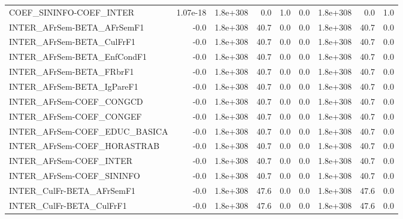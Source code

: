 \begin{tabular}{lrrrrrrrr}
COEF\_SININFO-COEF\_INTER              &    1.07e-18 &     1.8e+308 &     0.0 &      1.0 &        0.0 &    1.8e+308 &          0.0 &           1.0 \\
INTER\_AFrSem-BETA\_AFrSemF1           &        -0.0 &     1.8e+308 &    40.7 &      0.0 &        0.0 &    1.8e+308 &         40.7 &           0.0 \\
INTER\_AFrSem-BETA\_CulFrF1            &        -0.0 &     1.8e+308 &    40.7 &      0.0 &        0.0 &    1.8e+308 &         40.7 &           0.0 \\
INTER\_AFrSem-BETA\_EnfCondF1          &        -0.0 &     1.8e+308 &    40.7 &      0.0 &        0.0 &    1.8e+308 &         40.7 &           0.0 \\
INTER\_AFrSem-BETA\_FRbrF1             &        -0.0 &     1.8e+308 &    40.7 &      0.0 &        0.0 &    1.8e+308 &         40.7 &           0.0 \\
INTER\_AFrSem-BETA\_IgPareF1           &        -0.0 &     1.8e+308 &    40.7 &      0.0 &        0.0 &    1.8e+308 &         40.7 &           0.0 \\
INTER\_AFrSem-COEF\_CONGCD             &        -0.0 &     1.8e+308 &    40.7 &      0.0 &        0.0 &    1.8e+308 &         40.7 &           0.0 \\
INTER\_AFrSem-COEF\_CONGEF             &        -0.0 &     1.8e+308 &    40.7 &      0.0 &        0.0 &    1.8e+308 &         40.7 &           0.0 \\
INTER\_AFrSem-COEF\_EDUC\_BASICA        &        -0.0 &     1.8e+308 &    40.7 &      0.0 &        0.0 &    1.8e+308 &         40.7 &           0.0 \\
INTER\_AFrSem-COEF\_HORASTRAB          &        -0.0 &     1.8e+308 &    40.7 &      0.0 &        0.0 &    1.8e+308 &         40.7 &           0.0 \\
INTER\_AFrSem-COEF\_INTER              &        -0.0 &     1.8e+308 &    40.7 &      0.0 &        0.0 &    1.8e+308 &         40.7 &           0.0 \\
INTER\_AFrSem-COEF\_SININFO            &        -0.0 &     1.8e+308 &    40.7 &      0.0 &        0.0 &    1.8e+308 &         40.7 &           0.0 \\
INTER\_CulFr-BETA\_AFrSemF1            &        -0.0 &     1.8e+308 &    47.6 &      0.0 &        0.0 &    1.8e+308 &         47.6 &           0.0 \\
INTER\_CulFr-BETA\_CulFrF1             &        -0.0 &     1.8e+308 &    47.6 &      0.0 &        0.0 &    1.8e+308 &         47.6 &           0.0 \\

\end{tabular}
